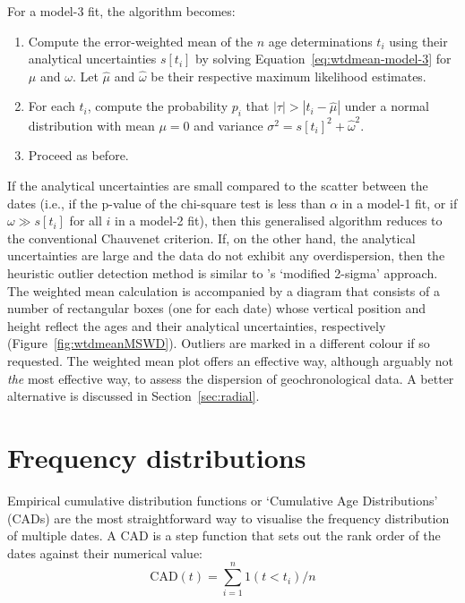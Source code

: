 \begin{refsection}
For a model-3 fit, the algorithm becomes:

\begin{enumerate}
\item Compute the error-weighted mean of the $n$ age determinations
  $t_i$ using their analytical uncertainties $s[t_i]$ by solving
  Equation~\ref{eq:wtdmean-model-3} for $\mu$ and $\omega$. Let
  $\hat{\mu}$ and $\hat{\omega}$ be their respective maximum
  likelihood estimates.
\item For each $t_i$, compute the probability $p_i$ that
  $|\tau|>|t_i-\hat{\mu}|$ under a normal distribution with mean
  $\mu=0$ and variance $\sigma^2=s[t_i]^2+\hat{\omega}^2$.
\item Proceed as before.
\end{enumerate}

If the analytical uncertainties are small compared to the scatter
between the dates (i.e., if the p-value of the chi-square test is less
than $\alpha$ in a model-1 fit, or if $\omega \gg s[t_i]$ for all $i$
in a model-2 fit), then this generalised algorithm reduces to the
conventional Chauvenet criterion. If, on the other hand, the
analytical uncertainties are large and the data do not exhibit any
overdispersion, then the heuristic outlier detection method is similar
to \citet{ludwig2003}'s `modified 2-sigma' approach.\\

The weighted mean calculation is accompanied by a diagram that
consists of a number of rectangular boxes (one for each date) whose
vertical position and height reflect the ages and their analytical
uncertainties, respectively (Figure~\ref{fig:wtdmeanMSWD}).  Outliers
are marked in a different colour if so requested. The weighted mean
plot offers an effective way, although arguably not \emph{the} most
effective way, to assess the dispersion of geochronological data. A
better alternative is discussed in Section~\ref{sec:radial}.

\section{Frequency distributions}
\label{sec:KDE+CAD}

Empirical cumulative distribution functions or `Cumulative Age
Distributions' (CADs) are the most straightforward way to visualise
the frequency distribution of multiple dates. A CAD is a step function
that sets out the rank order of the dates against their numerical
value:
\begin{equation}
  \mathrm{CAD}(t) = \sum_{i=1}^{n} 1(t<t_i)/n
  \label{eq:CAD}
\end{equation}


\end{refsection}
